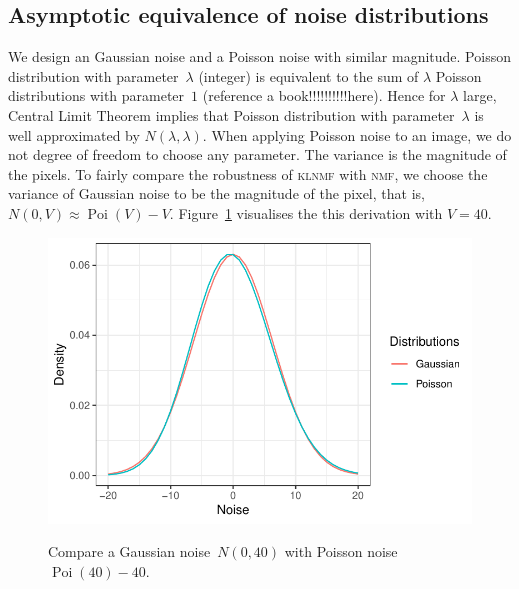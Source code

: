 \subsection{Asymptotic equivalence of noise distributions}
 We design an Gaussian noise and a Poisson noise with similar magnitude. Poisson distribution with parameter~$\lambda$ (integer) is equivalent to the sum of $\lambda$ Poisson distributions with parameter~$1$ (reference a book!!!!!!!!!!here). Hence for $\lambda$ large, Central Limit Theorem implies that Poisson distribution with parameter~$\lambda$ is well approximated by $N(\lambda,\lambda)$. When applying Poisson noise to an image, we do not degree of freedom to choose any parameter. The variance is the magnitude of the pixels. To fairly compare the robustness of \textsc{klnmf} with \textsc{nmf}, we choose the variance of Gaussian noise to be the magnitude of the pixel, that is, $N(0,V)\approx \operatorname{Poi}(V)-V$. Figure~\ref{noise} visualises the this derivation with $V=40$.
\begin{figure}
  \centering
  \includegraphics{resource/noise}\\
  \caption{Compare a Gaussian noise~$N(0,40)$ with Poisson noise $\operatorname{Poi}(40)-40$.}\label{noise}
\end{figure}
 
